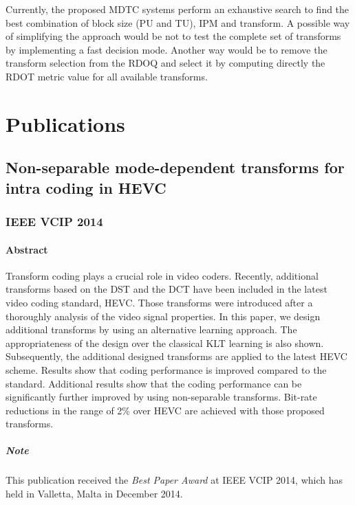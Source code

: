 \documentclass[11pt,a4paper,openright,twoside]{book}
\numberwithin{equation}{section} %
\numberwithin{figure}{section} %
\numberwithin{table}{section} %
\begin{document}
Currently, the proposed \ac{MDTC} systems perform an exhaustive search to find
the best combination of block size (\ac{PU} and \ac{TU}), \ac{IPM} and
transform.
A possible way of simplifying the approach would be not to test the complete
set of transforms by implementing a fast decision mode.
Another way would be to remove the transform selection from the \ac{RDOQ}
and select it by computing directly the \ac{RDOT} metric value for all
available transforms.

\chapter*{Publications}
\label{cha:publications}

\section*{Non-separable mode-dependent transforms for intra coding in HEVC}
\label{sec:non_separable_mode_dependent_transforms_for_intra_coding_in_hevc}

\subsection*{IEEE VCIP 2014}
\label{sub:ieee_vcip_2014_mddt}

\subsubsection*{Abstract}
\label{ssub:mddt_abstract}

Transform coding plays a crucial role in video coders.
Recently, additional transforms based on the \acs{DST} and the \acs{DCT} have
been included in the latest video coding standard, \acs{HEVC}.
Those transforms were introduced after a thoroughly analysis of the video
signal properties.
In this paper, we design additional transforms by using an alternative
learning approach.
The appropriateness of the design over the classical \acs{KLT} learning is
also shown.
Subsequently, the additional designed transforms are applied to the latest
\acs{HEVC} scheme.
Results show that coding performance is improved compared to the standard.
Additional results show that the coding performance can be significantly
further improved by using non-separable transforms.
Bit-rate reductions in the range of 2\% over \acs{HEVC} are achieved with
those proposed transforms.

\paragraph{Note}
\label{par:note}
This publication received the \emph{Best Paper Award} at IEEE VCIP 2014, which
has held in Valletta, Malta in December 2014.
\end{document}
